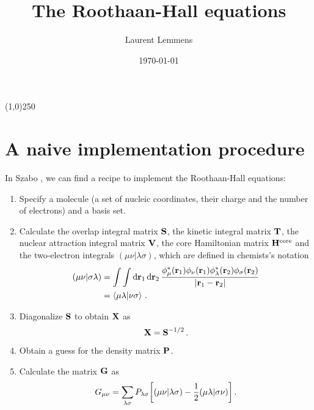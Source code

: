 \documentclass[12pt]{article}
\title{The Roothaan-Hall equations}
\author{Laurent Lemmens}
\date{\today \hspace{6pt} \currenttime}
\begin{document}
\maketitle

\begin{center}
\line(1,0){250}
\end{center}

\tableofcontents
\newpage


\section{A naive implementation procedure}
    In Szabo \cite{szabo}, we can find a recipe to implement the Roothaan-Hall equations:
    \begin{enumerate}
        \item Specify a molecule (a set of nucleic coordinates, their charge and the number of electrons) and a basis set.

        \item Calculate the overlap integral matrix $\vb{S}$, the kinetic integral matrix $\vb{T}$, the nuclear attraction integral matrix $\vb{V}$, the core Hamiltonian matrix $\vb{H}^\text{core}$ and the two-electron integrals $(\mu \nu|\lambda \sigma)$, which are defined in chemists's notation
        \begin{align}
            (\mu \nu|\sigma \lambda) &= \int \int \dd{\vb{r}_1} \dd{\vb{r}_2} \frac{\phi_\mu^*(\vb{r}_1) \phi_\nu(\vb{r}_1) \phi_\lambda^*(\vb{r}_2) \phi_\sigma(\vb{r}_2)}{|\vb{r}_1 - \vb{r}_2|} \\
            &= \braket{\mu \lambda}{\nu \sigma} \thinspace .
        \end{align}

        \item Diagonalize $\vb{S}$ to obtain $\vb{X}$ as
        \begin{equation}
            \vb{X} = \vb{S}^{-1/2} \thinspace .
        \end{equation}

        \item \label{item:scf:density_matrix} Obtain a guess for the density matrix $\vb{P}$.

        \item Calculate the matrix $\vb{G}$ as
        \begin{equation}
            G_{\mu \nu} = \sum_{\lambda \sigma} P_{\lambda \sigma} \qty[ (\mu \nu|\lambda \sigma) - \frac{1}{2} (\mu \lambda|\sigma \nu)] \thinspace .
        \end{equation}


\end{enumerate}
\end{document}
